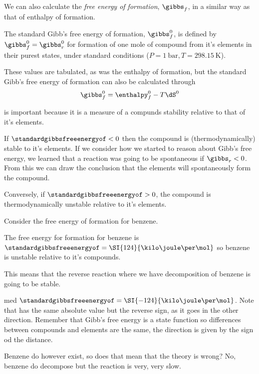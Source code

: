 \documentclass[../mit-general-chemistry.tex]{subfiles}
\begin{document}
We can also calculate the {\em free energy of formation}, $\gibbs_f$,
in a similar way as that of enthalpy of formation.

The standard Gibb's free energy of formation, $\gibbs^0_f$, is defined
by $\gibbs^0_f = \gibbs^0_r$ for formation of one mole of compound
from it's elements in their purest states, under standard conditions
($P = \SI{1}{\bar}, T = \SI{298.15}{\kelvin}$).

These values are tabulated, as was the enthalpy of formation, but the
standard Gibb's free energy of formation can also be calculated
through
\begin{equation*}
  \gibbs^0_f = \enthalpy^0_f - T \dS^0
\end{equation*}


\standardgibbsfreeenergyof is important because it
is a measure of a compunds stability relative to that of it's
elements.

If $\standardgibbsfreeenergyof < 0$ then the compound is
(thermodynamically) stable to it's elements. If we consider how we
started to reason about Gibb's free energy, we learned that a reaction
was going to be spontaneous if $\gibbs_r < 0$. From this we can draw
the conclusion that the elements will spontaneously form the
compound.

Conversely, if $\standardgibbsfreeenergyof > 0$, the compound is
thermodynamically unstable relative to it's elements.



Consider the free energy of formation for benzene.


The free energy for formation for benzene is
$\standardgibbsfreeenergyof = \SI{124}{\kilo\joule\per\mol}$ so
benzene is unstable relative to it's compounds.

This means that the reverse reaction where we have decomposition of
benzene is going to be stable.


med $\standardgibbsfreeenergyof =
\SI{-124}{\kilo\joule\per\mol}$. Note that \standardgibbsfreeenergyof
has the same absolute value but the reverse sign, as it goes in the
other direction. Remember that Gibb's free energy is a state function
so differences between compounds and elements are the same, the
direction is given by the sign od the distance.

Benzene do however exist, so does that mean that the theory is wrong?
No, benzene do decompose but the reaction is very, very slow.
\end{document}
